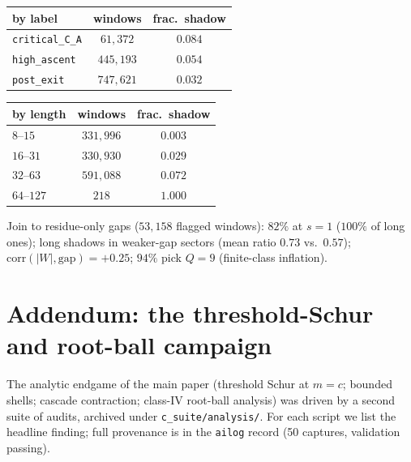 \documentclass[11pt]{article}
\theoremstyle{remark}
\begin{document}
\begin{center}\small
\begin{tabular}{@{}lcc@{}}
\toprule
by label & windows & frac.\ shadow\\
\midrule
\texttt{critical\_C\_A} & $61{,}372$ & $0.084$\\
\texttt{high\_ascent} & $445{,}193$ & $0.054$\\
\texttt{post\_exit} & $747{,}621$ & $0.032$\\
\bottomrule
\end{tabular}
\qquad
\begin{tabular}{@{}lcc@{}}
\toprule
by length & windows & frac.\ shadow\\
\midrule
$8$--$15$ & $331{,}996$ & $0.003$\\
$16$--$31$ & $330{,}930$ & $0.029$\\
$32$--$63$ & $591{,}088$ & $0.072$\\
$64$--$127$ & $218$ & $1.000$\\
\bottomrule
\end{tabular}
\end{center}
Join to residue-only gaps ($53{,}158$ flagged windows): $82\%$ at $s=1$ ($100\%$
of long ones); long shadows in weaker-gap sectors (mean ratio $0.73$ vs.\ $0.57$);
$\mathrm{corr}(|W|,\text{gap})=+0.25$; $94\%$ pick $Q=9$ (finite-class inflation).


\section{Addendum: the threshold-Schur and root-ball campaign}

The analytic endgame of the main paper (threshold Schur at $m=c$; bounded
shells; cascade contraction; class-IV root-ball analysis) was driven by a
second suite of audits, archived under \texttt{c\_suite/analysis/}. For
each script we list the headline finding; full provenance is in the
\texttt{ailog} record (50 captures, validation passing).
\end{document}
